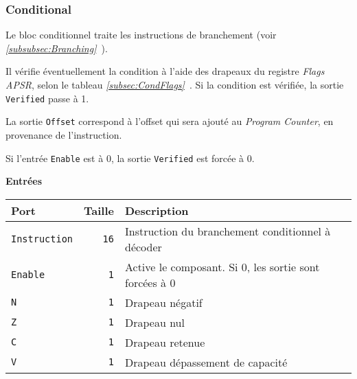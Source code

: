 \documentclass{article}
\begin{document}
    \subsubsection{Conditional}
    \label{sec:Conditional}

    Le bloc conditionnel traite les instructions de branchement (voir \textit{\ref{subsubsec:Branching}~}).

    Il vérifie éventuellement la condition à l'aide des drapeaux du registre \textit{Flags APSR}, selon le tableau  \textit{\ref{subsec:CondFlags}~}.
    Si la condition est vérifiée, la sortie \texttt{Verified} passe à 1.

    La sortie \texttt{Offset} correspond à l'offset qui sera ajouté au \textit{Program Counter}, en provenance de l'instruction.

    Si l'entrée \texttt{Enable} est à 0, la sortie \texttt{Verified} est forcée à 0.


    \textbf{Entrées}\\

    \begin{tabular}{|l|r|l|}
        \hline
        \textbf{Port}        & \textbf{Taille} & \textbf{Description}                              \\
        \hline

        \texttt{Instruction} & \texttt{16}     & Instruction du branchement conditionnel à décoder \\
        \hline
        \texttt{Enable} & \texttt{1} & Active le composant.
        Si 0, les sortie sont forcées à 0 \\
        \hline
        \texttt{N}           & \texttt{1}      & Drapeau négatif                                   \\
        \hline
        \texttt{Z}           & \texttt{1}      & Drapeau nul                                       \\
        \hline
        \texttt{C}           & \texttt{1}      & Drapeau retenue                                   \\
        \hline
        \texttt{V}           & \texttt{1}      & Drapeau dépassement de capacité                   \\


        \hline
    \end{tabular}
\end{document}
